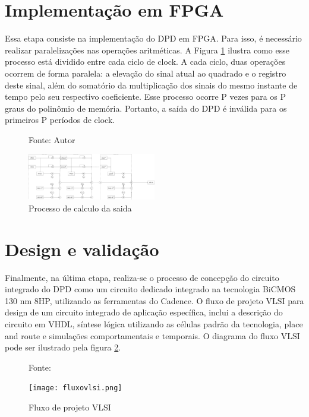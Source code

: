 \section{Implementação em FPGA}
Essa etapa consiste na implementação do DPD em FPGA. Para isso, é necessário realizar paralelizações nas operações aritméticas. A Figura \ref{fig:diagramaprocess} ilustra como esse processo está dividido entre cada ciclo de clock. A cada ciclo, duas operações ocorrem de forma paralela: a elevação do sinal atual ao quadrado e o registro deste sinal, além do somatório da multiplicação dos sinais do mesmo instante de tempo pelo seu respectivo coeficiente. Esse processo ocorre P vezes para os P graus do polinômio de memória. Portanto, a saída do DPD é inválida para os primeiros P períodos de clock.

\begin{figure}[ht!]
    \centering
    \captionsetup{justification=centering}
    \caption*{Fonte: Autor}
    \includegraphics[width=0.5\textwidth]{diagrama_process.png}
    \caption{Processo de calculo da saida}
    \label{fig:diagramaprocess}
\end{figure}

\section{Design e validação}
Finalmente, na última etapa, realiza-se o processo de concepção do circuito integrado do DPD como um circuito dedicado integrado na tecnologia BiCMOS 130 nm 8HP, utilizando as ferramentas do Cadence.
O fluxo de projeto VLSI  para design de um circuito integrado de aplicação específica, inclui a descrição do circuito em VHDL, síntese lógica utilizando as células padrão da tecnologia, place and route e simulações comportamentais e temporais. O diagrama do fluxo VLSI pode ser ilustrado pela figura \ref{fig:CMOS2010}.

\begin{figure}[ht!]
    \centering
    \captionsetup{justification=centering}
    \caption*{Fonte: \cite{CMOS2010}}
    \texttt{[image: fluxovlsi.png]}
    \caption{Fluxo de projeto VLSI}
    \label{fig:CMOS2010}
\end{figure}

